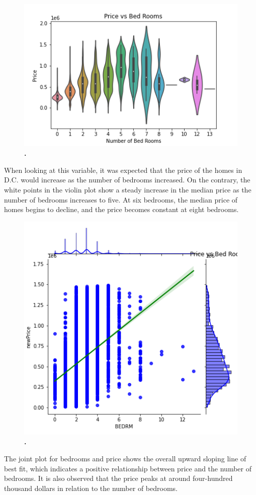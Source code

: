 \documentclass[12pt]{report}
\begin{document}
\begin{figure}[h]
\begin{center}
\includegraphics[width=130mm]{BedViolin.png}
\end{center}
\caption{\textbf{.}}
\label{fig:bedVio}
\end{figure}
When looking at this variable, it was expected that the price of the homes in D.C. would increase as the number of bedrooms increased. On the contrary, the white points in the violin plot show a steady increase in the median price as the number of bedrooms increases to five. At six bedrooms, the median price of homes begins to decline, and the price becomes constant at eight bedrooms. 
\clearpage


\begin{figure}[h]
\begin{center}
\includegraphics[width=130mm]{BedJoint.png}
\end{center}
\caption{\textbf{.}}
\label{fig:bedJoint}
\end{figure}
The joint plot for bedrooms and price shows the overall upward sloping line of best fit, which indicates a positive relationship between price and the number of bedrooms. It is also observed that the price peaks at around four-hundred thousand dollars in relation to the number of bedrooms. 
\clearpage
\end{document}
